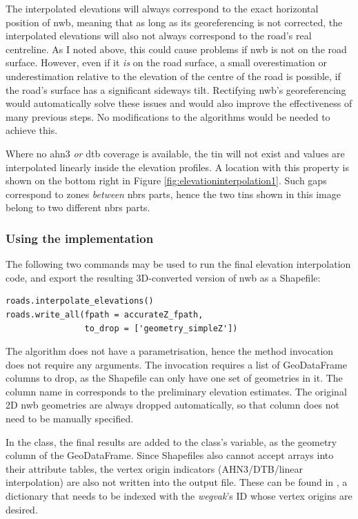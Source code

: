 The interpolated elevations will always correspond to the exact horizontal position of \ac{nwb}, meaning that as long as its georeferencing is not corrected, the interpolated elevations will also not always correspond to the road's real centreline. As I noted above, this could cause problems if \ac{nwb} is not on the road surface. However, even if it \textit{is} on the road surface, a small overestimation or underestimation relative to the elevation of the centre of the road is possible, if the road's surface has a significant sideways tilt. Rectifying \ac{nwb}'s georeferencing would automatically solve these issues and would also improve the effectiveness of many previous steps. No modifications to the algorithms would be needed to achieve this.

Where no \ac{ahn3} \textit{or} \ac{dtb} coverage is available, the \ac{tin} will not exist and values are interpolated linearly inside the elevation profiles. A location with this property is shown on the bottom right in Figure \ref{fig:elevationinterpolation1}. Such gaps correspond to zones \textit{between} \ac{nbrs} parts, hence the two \ac{tin}s shown in this image belong to two different \ac{nbrs} parts.

\subsubsection{Using the implementation}

The following two commands may be used to run the final elevation interpolation code, and export the resulting 3D-converted version of \ac{nwb} as a Shapefile:

\begin{verbatim}
roads.interpolate_elevations()
roads.write_all(fpath = accurateZ_fpath,
                to_drop = ['geometry_simpleZ'])
\end{verbatim}

The algorithm does not have a parametrisation, hence the method invocation does not require any arguments. The  invocation requires a list of GeoDataFrame columns to drop, as the Shapefile can only have one set of geometries in it. The column name in  corresponds to the preliminary elevation estimates. The original 2D \ac{nwb} geometries are always dropped automatically, so that column does not need to be manually specified.

In the  class, the final results are added to the class's  variable, as the  geometry column of the GeoDataFrame. Since Shapefiles also cannot accept arrays into their attribute tables, the vertex origin indicators (AHN3/DTB/linear interpolation) are also not written into the output file. These can be found in , a dictionary that needs to be indexed with the \textit{wegvak}'s ID whose vertex origins are desired.

